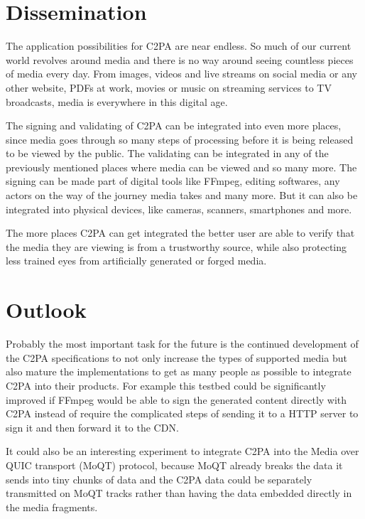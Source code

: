 \section{Dissemination\label{sec:dissemination}}

The application possibilities for C2PA are near endless. So much of our current world revolves around media and there is no way around seeing countless pieces of media every day. From images, videos and live streams on social media or any other website, PDFs at work, movies or music on streaming services to TV broadcasts, media is everywhere in this digital age.

The signing and validating of C2PA can be integrated into even more places, since media goes through so many steps of processing before it is being released to be viewed by the public. The validating can be integrated in any of the previously mentioned places where media can be viewed and so many more. The signing can be made part of digital tools like FFmpeg, editing softwares, any actors on the way of the journey media takes and many more. But it can also be integrated into physical devices, like cameras, scanners, smartphones and more.

The more places C2PA can get integrated the better user are able to verify that the media they are viewing is from a trustworthy source, while also protecting less trained eyes from artificially generated or forged media.

\section{Outlook\label{sec:outlook}}

Probably the most important task for the future is the continued development of the C2PA specifications to not only increase the types of supported media but also mature the implementations to get as many people as possible to integrate C2PA into their products. For example this testbed could be significantly improved if FFmpeg would be able to sign the generated content directly with C2PA instead of require the complicated steps of sending it to a HTTP server to sign it and then forward it to the CDN.

It could also be an interesting experiment to integrate C2PA into the Media over QUIC transport (MoQT) protocol, because MoQT already breaks the data it sends into tiny chunks of data and the C2PA data could be separately transmitted on MoQT tracks rather than having the data embedded directly in the media fragments.

